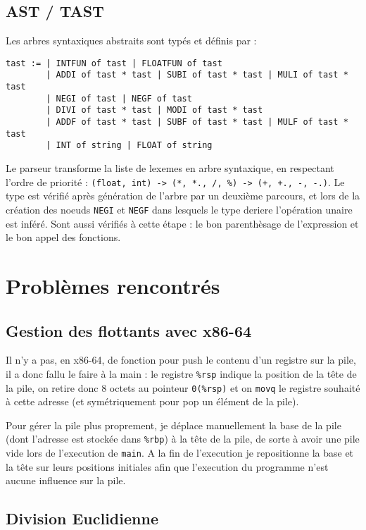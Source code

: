 \documentclass[11pt,a4paper]{article}
\begin{document}
\subsection{AST / TAST}

Les arbres syntaxiques abstraits sont typés et définis par :

\begin{verbatim}
tast := | INTFUN of tast | FLOATFUN of tast
        | ADDI of tast * tast | SUBI of tast * tast | MULI of tast * tast
        | NEGI of tast | NEGF of tast
        | DIVI of tast * tast | MODI of tast * tast
        | ADDF of tast * tast | SUBF of tast * tast | MULF of tast * tast
        | INT of string | FLOAT of string
\end{verbatim}

Le parseur transforme la liste de lexemes en arbre syntaxique, en respectant l'ordre de priorité : \verb|(float, int) -> (*, *., /, %) -> (+, +., -, -.)|. Le type est vérifié après génération de l'arbre par un deuxième parcours, et lors de la création des noeuds \verb|NEGI| et \verb|NEGF| dans lesquels le type deriere l'opération unaire est inféré. Sont aussi vérifiés à cette étape : le bon parenthèsage de l'expression et le bon appel des fonctions.

\section{Problèmes rencontrés}

\subsection{Gestion des flottants avec x86-64}

Il n'y a pas, en x86-64, de fonction pour push le contenu d'un registre sur la pile, il a donc fallu le faire à la main : le registre \verb|%rsp| indique la position de la tête de la pile, on retire donc 8 octets au pointeur \verb|0(%rsp)| et on \verb|movq| le registre souhaité à cette adresse (et symétriquement pour pop un élément de la pile).

Pour gérer la pile plus proprement, je déplace manuellement la base de la pile (dont l'adresse est stockée dans \verb|%rbp|) à la tête de la pile, de sorte à avoir une pile vide lors de l'execution de \verb|main|. A la fin de l'execution je repositionne la base et la tête sur leurs positions initiales afin que l'execution du programme n'est aucune influence sur la pile.

\subsection{Division Euclidienne}
\end{document}
